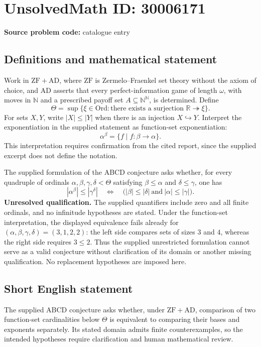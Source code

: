 \documentclass[11pt]{article}
\newcommand{\N}{\mathbb{N}}
\newcommand{\R}{\mathbb{R}}
\begin{document}
\section*{UnsolvedMath ID: 30006171}
\textbf{Source problem code:} catalogue entry
\subsection{Definitions and mathematical statement}
Work in \(\mathrm{ZF}+\mathrm{AD}\), where \(\mathrm{ZF}\) is Zermelo--Fraenkel set theory without the axiom of choice, and \(\mathrm{AD}\) asserts that every perfect-information game of length \(\omega\), with moves in \(\N\) and a prescribed payoff set \(A\subseteq\N^\N\), is determined. Define
\[
\Theta=\sup\{\xi\in\mathrm{Ord}:\text{there exists a surjection }\R\twoheadrightarrow\xi\}.
\]
For sets \(X,Y\), write \(|X|\leq|Y|\) when there is an injection \(X\hookrightarrow Y\). Interpret the exponentiation in the supplied statement as function-set exponentiation:
\[
\alpha^\beta=\{f\mid f:\beta\longrightarrow\alpha\}.
\]
This interpretation requires confirmation from the cited report, since the supplied excerpt does not define the notation.

The supplied formulation of the ABCD conjecture asks whether, for every quadruple of ordinals \(\alpha,\beta,\gamma,\delta<\Theta\) satisfying \(\beta\leq\alpha\) and \(\delta\leq\gamma\), one has
\[
|\alpha^\beta|\leq|\gamma^\delta|
\quad\Longleftrightarrow\quad
\bigl(|\beta|\leq|\delta|\ \text{and}\ |\alpha|\leq|\gamma|\bigr).
\]
\textbf{Unresolved qualification.} The supplied quantifiers include zero and all finite ordinals, and no infinitude hypotheses are stated. Under the function-set interpretation, the displayed equivalence fails already for \((\alpha,\beta,\gamma,\delta)=(3,1,2,2)\): the left side compares sets of sizes \(3\) and \(4\), whereas the right side requires \(3\leq2\). Thus the supplied unrestricted formulation cannot serve as a valid conjecture without clarification of its domain or another missing qualification. No replacement hypotheses are imposed here.
\subsection{Short English statement}
The supplied ABCD conjecture asks whether, under \(\mathrm{ZF}+\mathrm{AD}\), comparison of two function-set cardinalities below \(\Theta\) is equivalent to comparing their bases and exponents separately. Its stated domain admits finite counterexamples, so the intended hypotheses require clarification and human mathematical review.
\end{document}
